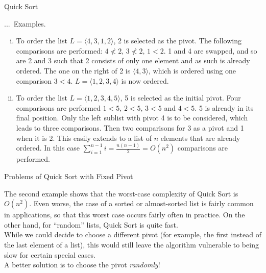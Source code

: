 \documentclass[smaller,hyperref={CJKbookmarks=true}]{beamer}
\newcounter{zhuo}[subsection]
\renewcommand{\thezhuo}{\thesection.\thesubsection.\arabic{zhuo}}
\newenvironment{EXAMPLES}{\stepcounter{zhuo}\alert{\!\thezhuo.~Examples.\,}}{}
\begin{document}
\begin{frame}[t]{Quick Sort}
\begin{spacing}{1.2}
\begin{EXAMPLES}
\begin{enumerate}[(i)]
  \item To order the list $L=\langle4,3,1,2\rangle$, 2 is selected as the pivot. The following comparisons are performed: $4\nless 2,\,3\nless 2,\,1<2$. 1 and 4 are swapped, and so are 2 and 3 such that 2 consists of only one element and as such is already ordered. The one on the right of 2 is $\langle4,3\rangle$, which is ordered using one comparison $3<4$. $L=\langle1,2,3,4\rangle$ is now ordered.
  \item To order the list $L=\langle1,2,3,4,5\rangle$, 5 is selected as the initial pivot. Four comparisons are performed $1<5,\,2<5,\,3<5$ and $4<5$. 5 is already in its final position. Only the left sublist with pivot 4 is to be considered, which leads to three comparisons. Then two comparisons for 3 as a pivot and 1 when it is 2. This easily extends to a list of $n$ elements that are already ordered. In this case $\sum_{i=1}^{n-1}i=\frac{n(n-1)}{2}=O(n^2)$ comparisons are performed.
\end{enumerate}
\end{EXAMPLES}
\end{spacing}
\end{frame}
\begin{frame}[c]{Problems of Quick Sort with Fixed Pivot}
\begin{spacing}{1.1}
The second example shows that the worst-case complexity of Quick Sort is
$O(n^2)$. Even worse, the case of a sorted or almost-sorted list is fairly
common in applications, so that this worst case occurs fairly often in
practice. On the other hand, for ``random'' lists, Quick Sort is quite fast.\\[6pt]
While we could decide to choose a different pivot (for example, the first
instead of the last element of a list), this would still leave the algorithm
vulnerable to being slow for certain special cases.\\[6pt]
A better solution is to choose the pivot \emph{randomly}!
\end{spacing}
\end{frame}
\end{document}
